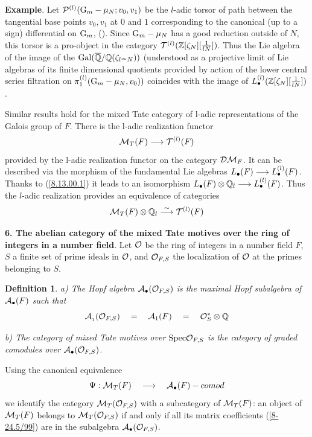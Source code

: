\documentclass[10pt]{article}
\newtheorem{definition}[theorem]{Definition}
\begin{document}
{\bf Example}.  Let ${\cal P}^{(l)}({\rm G}_m - \mu_N; v_0, v_1)$ be the $l$-adic torsor of path between the tangential base points $v_0, v_1$  at $0$ and $1$ corresponding to the canonical (up to a sign) differential  on
${\rm G}_m$, (\cite{D}). Since ${\rm G}_m - \mu_N$ has a good reduction outside of $N$, this torsor  
 is a pro-object in the category 
${\cal T}^{(l)}({\mathbb Z}[\zeta_N][\frac{1}{lN}])$. Thus the Lie algebra of the image of the 
${\rm Gal}(\overline {{\mathbb Q}}/ {\mathbb Q}(\zeta_{l^{\infty}N}))$ (understood as a projective limit 
of Lie algebras of its finite dimensional quotients 
provided by action of the lower central series filtration on 
 $\pi^{(l)}_1({\rm G}_m - \mu_N, v_0))$  coincides with the image 
of $L^{(l)}_{\bullet}({\mathbb Z}[\zeta_N][\frac{1}{lN}])$. 

  
Similar  results hold for the mixed Tate category of l-adic representations of 
the Galois group of $F$. 
There is the l-adic realization functor 
$$
{\cal M}_T(F) \longrightarrow {\cal T}^{(l)}(F)
$$
provided by the l-adic realization functor on the category ${\cal D}{\cal M}_F$. 
It can be described  via the morphism of the fundamental Lie algebras 
$
L_{\bullet}(F) \longrightarrow L^{(l)}_{\bullet}(F)
$. 
Thanks to (\ref{8.13.00.1}) it  leads to an  isomorphism 
$L_{\bullet}(F)\otimes {\mathbb Q}_l \longrightarrow L^{(l)}_{\bullet}(F)$. Thus the $l$-adic realization provides 
an equivalence of categories
$$
{\cal M}_T(F)\otimes {\mathbb Q}_l \stackrel{\sim }{\longrightarrow} {\cal T}^{(l)}(F)
$$
 

{\bf 6. The abelian category of the mixed Tate motives over the ring of integers in 
a number field}. Let ${\cal O}$ be the ring of integers in a number field $F$, 
 $S$ a finite set of prime ideals in ${\cal O}$, and 
${\cal O}_{F, S}$ the  localization of ${\cal O}$ at the primes belonging to  $S$. 


\begin{definition} \label{8-24.2/99}
a) The Hopf algebra ${\cal A}_{\bullet}({\cal O}_{F, S})$ is the maximal 
Hopf subalgebra 
of ${\cal A}_{\bullet}(F)$ such that 
$$
{\cal A}_{_{1}}({\cal O}_{F, S}) \quad = \quad {\cal A}_{1}(F) \quad = \quad {\cal O}^*_S \otimes {\mathbb Q}
$$

b) The category of mixed Tate motives over ${\rm Spec}{\cal O}_{F, S}$ 
is   
the category of graded comodules over ${\cal A}_{\bullet}({\cal O}_{F, S})$. 
\end{definition}

Using the canonical equivalence 
$$
\Psi:  {\cal M}_T(F) \quad \longrightarrow \quad {\cal A}_{\bullet}(F)-comod
$$
we identify the category ${\cal M}_T({\cal O}_{F, S})$ with a   
subcategory of ${\cal M}_T(F)$: an object of ${\cal M}_T(F)$ belongs to ${\cal M}_T({\cal O}_{F, S})$ if and only if all its matrix coefficients 
(\ref{8-24.5/99}) are in the subalgebra ${\cal A}_{\bullet}({\cal O}_{F, S})$. 
\end{document}
